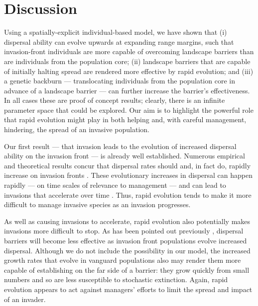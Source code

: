 \documentclass{article}
\begin{document}
\section{Discussion}

Using a spatially-explicit individual-based model, we have shown that (i) dispersal ability can evolve upwards at expanding range margins, such that invasion-front individuals are more capable of overcoming landscape barriers than are individuals from the population core; (ii) landscape barriers that are capable of initially halting spread are rendered more effective by rapid evolution; and (iii) a genetic backburn --- translocating individuals from the population core in advance of a landscape barrier --- can further increase the barrier's effectiveness. In all cases these are proof of concept results; clearly, there is an infinite parameter space that could be explored.  Our aim is to highlight the powerful role that rapid evolution might play in both helping and, with careful management, hindering, the spread of an invasive population.

Our first result --- that invasion leads to the evolution of increased dispersal ability on the invasion front --- is already well established.  Numerous empirical and theoretical results concur that dispersal rates should and, in fact do, rapidly increase on invasion fronts \citep[reviewed in][]{Phillips_Brown_Shine_2010}.  These evolutionary increases in dispersal can happen rapidly --- on time scales of relevance to management --- and can lead to invasions that accelerate over time \citep{Perkins_2012, Travis_Dytham_2002, Phillips_Brown_Travis_Shine_2008}.  Thus, rapid evolution tends to make it more difficult to manage invasive species as an invasion progresses.

As well as causing invasions to accelerate, rapid evolution also potentially makes invasions more difficult to stop.  As has been pointed out previously \citep{Travis_Smith_Ranwala_2010}, dispersal barriers will become less effective as invasion front populations evolve increased dispersal.  Although we do not include the possibility in our model, the increased growth rates that evolve in vanguard populations \citep{Phillips_2009} also may render them more capable of establishing on the far side of a barrier: they grow quickly from small numbers and so are less susceptible to stochastic extinction.  Again, rapid evolution appears to act against managers' efforts to limit the spread and impact of an invader.
\end{document}
